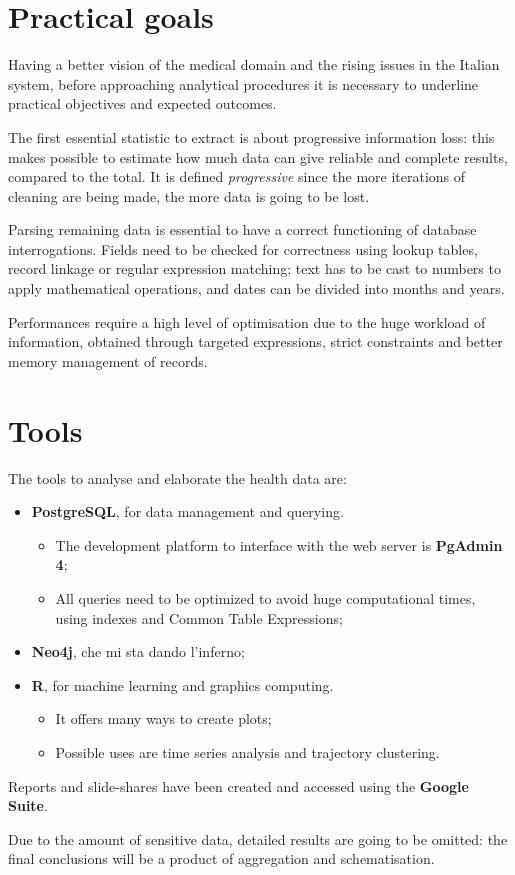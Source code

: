 \section{Practical goals }
Having a better vision of the medical domain and the rising issues in the Italian system, before approaching analytical procedures it is necessary to underline practical objectives and expected outcomes.

The first essential statistic to extract is about progressive information loss: this makes possible to estimate how much data can give reliable and complete results, compared to the total. It is defined \textit{progressive} since the more iterations of cleaning are being made, the more data is going to be lost. 

Parsing remaining data is essential to have a correct functioning of database interrogations. Fields need to be checked for correctness using lookup tables, record linkage or regular expression matching; text has to be cast to numbers to apply mathematical operations, and dates can be divided into months and years.

Performances require a high level of optimisation due to the huge workload of information, obtained through targeted expressions, strict constraints and better memory management of records. 


\section{Tools} %
The tools to analyse and elaborate the health data are:
\begin{itemize}
	\item \textbf{PostgreSQL}, for data management and querying. 
	\begin{itemize}
		\item The development platform to interface with the web server is \textbf{PgAdmin 4};
		\item All queries need to be optimized to avoid huge computational times, using indexes and Common Table Expressions;
	\end{itemize}
	\item \textbf{Neo4j}, che mi sta dando l'inferno;
	\item \textbf{R}, for machine learning and graphics computing. 
	\begin{itemize}
		\item It offers many ways to create plots;
		\item Possible uses are time series analysis and trajectory clustering.
	\end{itemize}
\end{itemize}

Reports and slide-shares have been created and accessed using the \textbf{Google Suite}.

Due to the amount of sensitive data, detailed results are going to be omitted: the final conclusions will be a product of aggregation and schematisation.
